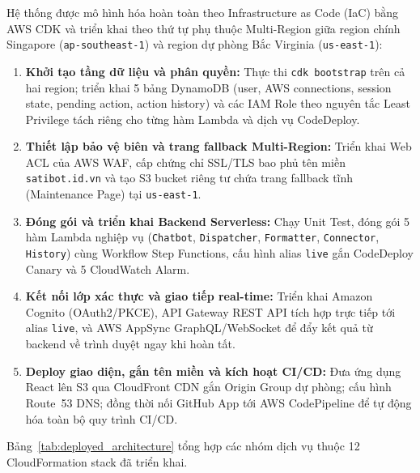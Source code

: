 \documentclass[a4paper,12pt]{article}
\newcommand{\code}[1]{\texttt{#1}}
\begin{document}
Hệ thống được mô hình hóa hoàn toàn theo Infrastructure as Code (IaC) bằng AWS CDK và triển khai theo thứ tự phụ thuộc Multi-Region giữa region chính Singapore (\code{ap-southeast-1}) và region dự phòng Bắc Virginia (\code{us-east-1}):

\begin{enumerate}[itemsep=3pt,topsep=2pt]
  \item \textbf{Khởi tạo tầng dữ liệu và phân quyền:} Thực thi \code{cdk bootstrap} trên cả hai region; triển khai 5 bảng DynamoDB (user, AWS connections, session state, pending action, action history) và các IAM Role theo nguyên tắc Least Privilege tách riêng cho từng hàm Lambda và dịch vụ CodeDeploy.
  \item \textbf{Thiết lập bảo vệ biên và trang fallback Multi-Region:} Triển khai Web ACL của AWS WAF, cấp chứng chỉ SSL/TLS bao phủ tên miền \code{satibot.id.vn} và tạo S3 bucket riêng tư chứa trang fallback tĩnh (Maintenance Page) tại \code{us-east-1}.
  \item \textbf{Đóng gói và triển khai Backend Serverless:} Chạy Unit Test, đóng gói 5 hàm Lambda nghiệp vụ (\code{Chatbot}, \code{Dispatcher}, \code{Formatter}, \code{Connector}, \code{History}) cùng Workflow Step Functions, cấu hình alias \code{live} gắn CodeDeploy Canary và 5 CloudWatch Alarm.
  \item \textbf{Kết nối lớp xác thực và giao tiếp real-time:} Triển khai Amazon Cognito (OAuth2/PKCE), API Gateway REST API tích hợp trực tiếp tới alias \code{live}, và AWS AppSync GraphQL/WebSocket để đẩy kết quả từ backend về trình duyệt ngay khi hoàn tất.
  \item \textbf{Deploy giao diện, gắn tên miền và kích hoạt CI/CD:} Đưa ứng dụng React lên S3 qua CloudFront CDN gắn Origin Group dự phòng; cấu hình Route~53 DNS; đồng thời nối GitHub App tới AWS CodePipeline để tự động hóa toàn bộ quy trình CI/CD.
\end{enumerate}

Bảng~\ref{tab:deployed_architecture} tổng hợp các nhóm dịch vụ thuộc 12 CloudFormation stack đã triển khai.
\end{document}

